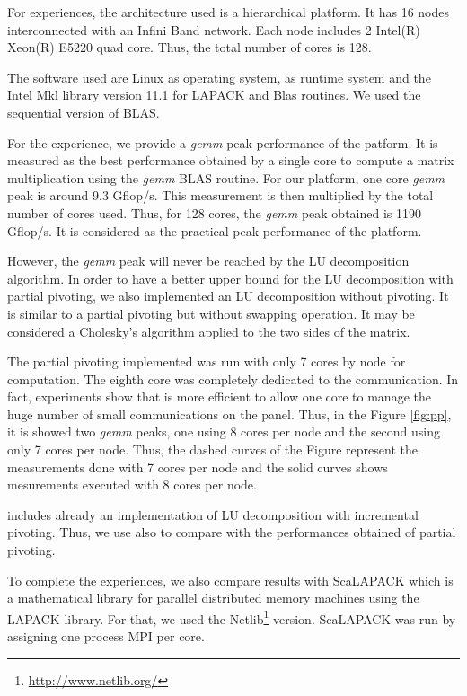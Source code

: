 For experiences, the architecture used is a hierarchical platform. It has 16 nodes interconnected with an Infini Band network. Each node includes  2 Intel(R) Xeon(R) E5220 quad core. Thus, the  total number of cores is 128.

The software used are Linux as operating system, \dague as runtime system and the Intel Mkl library version 11.1 for LAPACK and Blas routines. We used the sequential version of BLAS.

For the experience, we provide a \emph{gemm} peak performance of the patform. It is measured as the best performance obtained by a single core to compute a matrix multiplication using the \emph{gemm} BLAS routine. For our platform, one core \emph{gemm} peak is around 9.3 Gflop/s. This measurement is then multiplied by the total number of cores used. Thus, for 128 cores, the \emph{gemm} peak obtained is 1190 Gflop/s. It is considered as the practical peak performance of the platform. 

However, the \emph{gemm} peak will never be reached by the LU decomposition algorithm. In order to have a better upper bound for the LU decomposition with partial pivoting, we also implemented an LU decomposition without pivoting. It is similar to a partial pivoting but without swapping operation. It may be considered a Cholesky's algorithm applied to the two sides of the matrix.

The partial pivoting implemented was run with only 7 cores by node for computation. The eighth core was completely dedicated to the communication. In fact, experiments show that is more efficient to allow one core to manage the huge number of small communications on the panel. Thus, in the Figure \ref{fig:pp}, it is showed two \emph{gemm} peaks, one using 8 cores per node and the second using only 7 cores per node. Thus, the dashed curves of the Figure represent the measurements done with 7 cores per node and the solid curves shows mesurements executed with 8 cores per node.

\dague includes already an implementation of LU decomposition with incremental pivoting. Thus, we use also to compare with the performances obtained of partial pivoting.

To complete the experiences, we also compare results with ScaLAPACK which is a mathematical library for parallel distributed memory machines using the LAPACK library. For that, we used the Netlib\footnote{\url{http://www.netlib.org/}} version. ScaLAPACK was run by assigning one process MPI per core.

